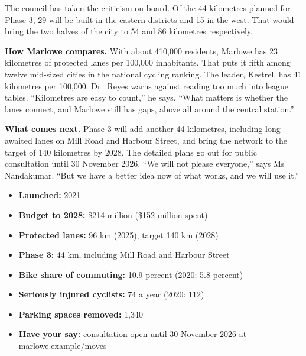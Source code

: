 \documentclass[10pt,a4paper]{article}
\begin{document}
\begin{multicols}{2}
The council has taken the criticism on board. Of the 44 kilometres planned for Phase 3, 29 will be built in
the eastern districts and 15 in the west. That would bring the two halves of the city to 54 and 86
kilometres respectively.

\textbf{How Marlowe compares.} With about 410,000 residents, Marlowe has 23 kilometres of protected lanes
per 100,000 inhabitants. That puts it fifth among twelve mid-sized cities in the national cycling
ranking. The leader, Kestrel, has 41 kilometres per 100,000. Dr.\ Reyes warns against reading too much into
league tables. ``Kilometres are easy to count,'' he says. ``What matters is whether the lanes connect, and
Marlowe still has gaps, above all around the central station.''

\textbf{What comes next.} Phase 3 will add another 44 kilometres, including long-awaited lanes on Mill Road
and Harbour Street, and bring the network to the target of 140 kilometres by 2028. The detailed plans go
out for public consultation until 30 November 2026. ``We will not please everyone,'' says Ms Nandakumar. ``But
we have a better idea now of what works, and we will use it.''

\begin{tcolorbox}[colback=black!5, colframe=ink, boxrule=0.5pt, sharp corners, left=6pt, right=6pt, top=4pt, bottom=4pt,
  title={\sffamily\bfseries Marlowe Moves at a glance}, fonttitle=\sffamily\small, coltitle=white, colbacktitle=ink]
\sffamily\footnotesize
\begin{itemize}[leftmargin=1.0em, itemsep=1pt, topsep=1pt]
  \item \textbf{Launched:} 2021
  \item \textbf{Budget to 2028:} \$214 million (\$152 million spent)
  \item \textbf{Protected lanes:} 96 km (2025), target 140 km (2028)
  \item \textbf{Phase 3:} 44 km, including Mill Road and Harbour Street
  \item \textbf{Bike share of commuting:} 10.9 percent (2020: 5.8 percent)
  \item \textbf{Seriously injured cyclists:} 74 a year (2020: 112)
  \item \textbf{Parking spaces removed:} 1,340
  \item \textbf{Have your say:} consultation open until 30 November 2026 at marlowe.example/moves
\end{itemize}
\end{tcolorbox}
\end{multicols}
\end{document}
